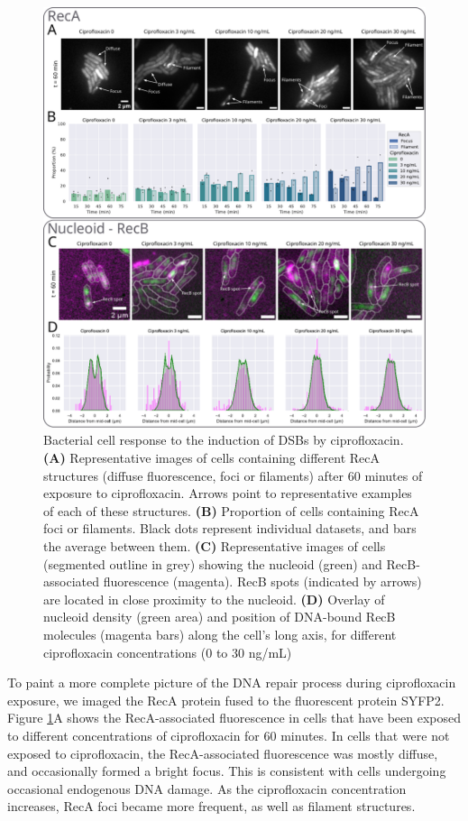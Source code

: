 \begin{figure}[htbp]
    \centering
    \includegraphics[width=.8\textwidth]{Figures/Fig3_cell_response.pdf}
    \caption{Bacterial cell response to the induction of DSBs by ciprofloxacin. \textbf{(A)} Representative images of cells containing different RecA structures (diffuse fluorescence, foci or filaments) after 60 minutes of exposure to ciprofloxacin. Arrows point to representative examples of each of these structures. \textbf{(B)} Proportion of cells containing RecA foci or filaments. Black dots represent individual datasets, and bars the average between them. \textbf{(C)} Representative images of cells (segmented outline in grey) showing the nucleoid (green) and RecB-associated fluorescence (magenta). RecB spots (indicated by arrows) are located in close proximity to the nucleoid. \textbf{(D)} Overlay of nucleoid density (green area) and position of DNA-bound RecB molecules (magenta bars) along the cell's long axis, for different ciprofloxacin concentrations (0 to 30 ng/mL)}
    \label{Fig:reca_nucleoid}
\end{figure}

To paint a more complete picture of the DNA repair process during ciprofloxacin exposure, we imaged the RecA protein fused to the fluorescent protein SYFP2. Figure \ref{Fig:reca_nucleoid}A shows the RecA-associated fluorescence in cells that have been exposed to different concentrations of ciprofloxacin for 60 minutes. In cells that were not exposed to ciprofloxacin, the RecA-associated fluorescence was mostly diffuse, and occasionally formed a bright focus. This is consistent with cells undergoing occasional endogenous DNA damage. As the ciprofloxacin concentration increases, RecA foci became more frequent, as well as filament structures.

